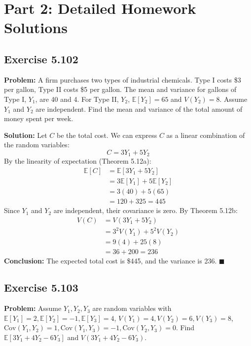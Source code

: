 \documentclass[11pt, a4paper]{article}
\theoremstyle{definition}
\theoremstyle{remark}
\newcommand{\E}{\mathbb{E}}
\begin{document}
\newpage
\section{Part 2: Detailed Homework Solutions}

\subsection{Exercise 5.102}
\textbf{Problem:} A firm purchases two types of industrial chemicals. Type I costs \$3 per gallon, Type II costs \$5 per gallon. The mean and variance for gallons of Type I, $Y_1$, are 40 and 4. For Type II, $Y_2$, $\E[Y_2] = 65$ and $V(Y_2) = 8$. Assume $Y_1$ and $Y_2$ are independent. Find the mean and variance of the total amount of money spent per week.

\textbf{Solution:}
Let $C$ be the total cost. We can express $C$ as a linear combination of the random variables:
\[ C = 3Y_1 + 5Y_2 \]
By the linearity of expectation (Theorem 5.12a):
\begin{align*}
\E[C] &= \E[3Y_1 + 5Y_2] \\
&= 3\E[Y_1] + 5\E[Y_2] \\
&= 3(40) + 5(65) \\
&= 120 + 325 = 445
\end{align*}
Since $Y_1$ and $Y_2$ are independent, their covariance is zero. By Theorem 5.12b:
\begin{align*}
V(C) &= V(3Y_1 + 5Y_2) \\
&= 3^2 V(Y_1) + 5^2 V(Y_2) \\
&= 9(4) + 25(8) \\
&= 36 + 200 = 236
\end{align*}
\textbf{Conclusion:} The expected total cost is \$445, and the variance is 236. $\blacksquare$

\subsection{Exercise 5.103}
\textbf{Problem:} Assume $Y_1, Y_2, Y_3$ are random variables with $\E[Y_1]=2, \E[Y_2]=-1, \E[Y_3]=4$, $V(Y_1)=4, V(Y_2)=6, V(Y_3)=8$, $\text{Cov}(Y_1,Y_2)=1, \text{Cov}(Y_1,Y_3)=-1, \text{Cov}(Y_2,Y_3)=0$. Find $\E[3Y_1 + 4Y_2 - 6Y_3]$ and $V(3Y_1 + 4Y_2 - 6Y_3)$.
\end{document}
